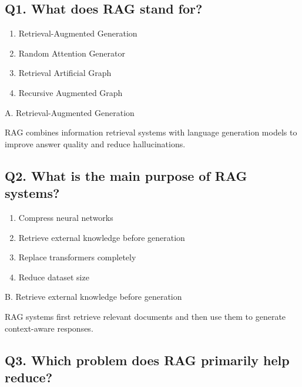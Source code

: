 \documentclass[12pt,a4paper]{article}
\begin{document}

\subsection*{Q1. What does RAG stand for?}

\begin{enumerate}[label=\Alph*.]
\item Retrieval-Augmented Generation
\item Random Attention Generator
\item Retrieval Artificial Graph
\item Recursive Augmented Graph
\end{enumerate}

\begin{tcolorbox}[colback=mid,colframe=softblue,title=Correct Answer]
A. Retrieval-Augmented Generation

RAG combines information retrieval systems with language generation models to improve answer quality and reduce hallucinations.
\end{tcolorbox}


\subsection*{Q2. What is the main purpose of RAG systems?}

\begin{enumerate}[label=\Alph*.]
\item Compress neural networks
\item Retrieve external knowledge before generation
\item Replace transformers completely
\item Reduce dataset size
\end{enumerate}

\begin{tcolorbox}[colback=mid,colframe=softblue,title=Correct Answer]
B. Retrieve external knowledge before generation

RAG systems first retrieve relevant documents and then use them to generate context-aware responses.
\end{tcolorbox}


\subsection*{Q3. Which problem does RAG primarily help reduce?}
\end{document}
